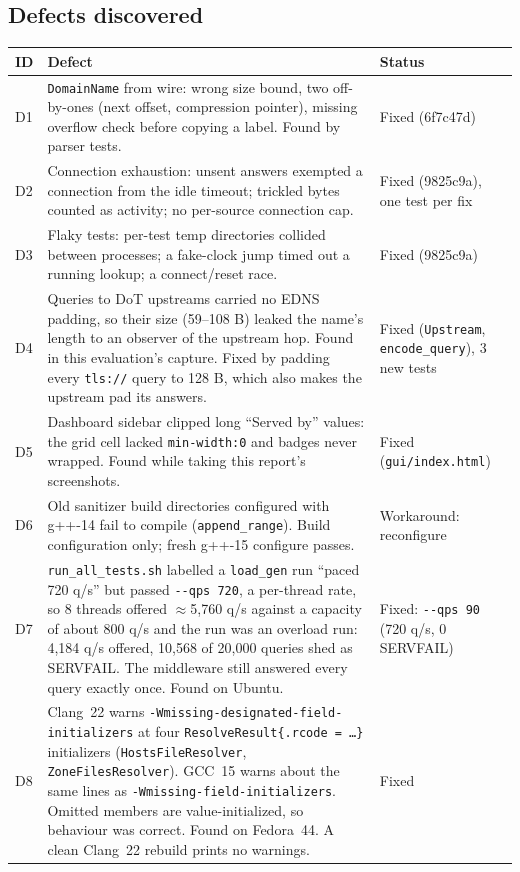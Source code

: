 \documentclass[11pt,a4paper]{article}
\newcommand{\code}[1]{\texttt{#1}}
\begin{document}
\subsection{Defects discovered}\label{sec:defects}
\begin{tabularx}{\textwidth}{@{}lLP{2.4cm}@{}}
\toprule
ID & Defect & Status \\
\midrule
D1 & \code{DomainName} from wire: wrong size bound, two off-by-ones (next offset, compression pointer), missing overflow check before copying a label. Found by parser tests. & Fixed (6f7c47d) \\
D2 & Connection exhaustion: unsent answers exempted a connection from the idle timeout; trickled bytes counted as activity; no per-source connection cap. & Fixed (9825c9a), one test per fix \\
D3 & Flaky tests: per-test temp directories collided between processes; a fake-clock jump timed out a running lookup; a connect/reset race. & Fixed (9825c9a) \\
D4 & Queries to DoT upstreams carried no EDNS padding, so their size (59--108 B) leaked the name's length to an observer of the upstream hop. Found in this evaluation's capture. Fixed by padding every \code{tls://} query to 128 B, which also makes the upstream pad its answers. & Fixed (\code{Upstream}, \code{encode\_\allowbreak query}), 3 new tests \\
D5 & Dashboard sidebar clipped long ``Served by'' values: the grid cell lacked \code{min-width:0} and badges never wrapped. Found while taking this report's screenshots. & Fixed (\code{gui/\allowbreak index.html}) \\
D6 & Old sanitizer build directories configured with g++-14 fail to compile (\code{append\_range}). Build configuration only; fresh g++-15 configure passes. & Workaround: reconfigure \\
D7 & \code{run\_all\_tests.sh} labelled a \code{load\_gen} run ``paced 720 q/s'' but passed \code{-{}-qps 720}, a per-thread rate, so 8 threads offered $\approx$5{,}760 q/s against a capacity of about 800 q/s and the run was an overload run: 4{,}184 q/s offered, 10{,}568 of 20{,}000 queries shed as SERVFAIL. The middleware still answered every query exactly once. Found on Ubuntu. & Fixed: \code{-{}-qps 90} (720 q/s, 0 SERVFAIL) \\
D8 & Clang~22 warns \code{-Wmissing-\allowbreak designated-\allowbreak field-\allowbreak initializers} at four \code{ResolveResult\{.rcode = \ldots\}} initializers (\code{HostsFileResolver}, \code{ZoneFilesResolver}). GCC~15 warns about the same lines as \code{-Wmissing-\allowbreak field-\allowbreak initializers}. Omitted members are value-initialized, so behaviour was correct. Found on Fedora~44. A clean Clang~22 rebuild prints no warnings. & Fixed \\

\end{tabularx}
\end{document}
